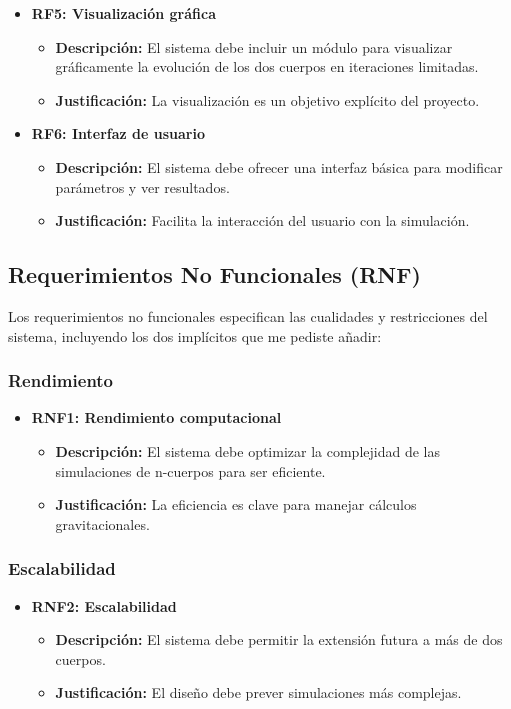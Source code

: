 \begin{itemize}
    \item \textbf{RF5: Visualización gráfica}
    \begin{itemize}
        \item \textbf{Descripción:} El sistema debe incluir un módulo para visualizar gráficamente la evolución de los dos cuerpos en iteraciones limitadas.
        \item \textbf{Justificación:} La visualización es un objetivo explícito del proyecto.
    \end{itemize}
    \item \textbf{RF6: Interfaz de usuario}
    \begin{itemize}
        \item \textbf{Descripción:} El sistema debe ofrecer una interfaz básica para modificar parámetros y ver resultados.
        \item \textbf{Justificación:} Facilita la interacción del usuario con la simulación.
    \end{itemize}
\end{itemize}

\subsection{Requerimientos No Funcionales (RNF)}

Los requerimientos no funcionales especifican las cualidades y restricciones del sistema, incluyendo los dos implícitos que me pediste añadir:

\subsubsection{Rendimiento}
\begin{itemize}
    \item \textbf{RNF1: Rendimiento computacional}
    \begin{itemize}
        \item \textbf{Descripción:} El sistema debe optimizar la complejidad de las simulaciones de n-cuerpos para ser eficiente.
        \item \textbf{Justificación:} La eficiencia es clave para manejar cálculos gravitacionales.
    \end{itemize}
\end{itemize}

\subsubsection{Escalabilidad}
\begin{itemize}
    \item \textbf{RNF2: Escalabilidad}
    \begin{itemize}
        \item \textbf{Descripción:} El sistema debe permitir la extensión futura a más de dos cuerpos.
        \item \textbf{Justificación:} El diseño debe prever simulaciones más complejas.
    \end{itemize}
\end{itemize}

